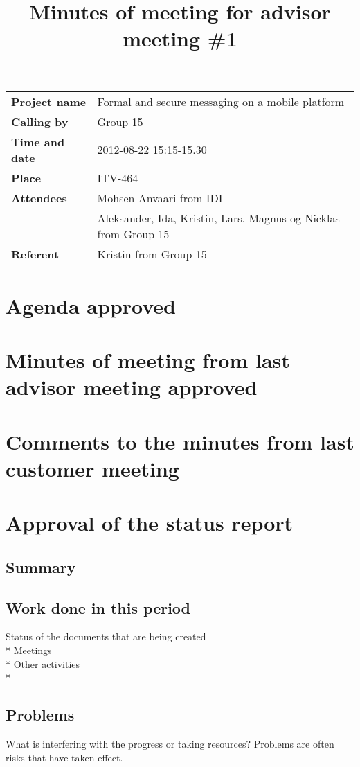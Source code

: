\documentclass[a4paper,12pt]{article}
\begin{document}
\title{Minutes of meeting for advisor meeting \#1}
\maketitle
\begin{tabular}{>{\bfseries}l l}	
Project name&Formal and secure messaging on a mobile platform\\
Calling by&Group 15\\
Time and date&2012-08-22 15:15-15.30\\
Place&ITV-464\\
Attendees&Mohsen Anvaari from IDI\\
 & Aleksander, Ida, Kristin, Lars, Magnus og Nicklas from Group 15\\
Referent&Kristin from Group 15\\
\end{tabular}
\section{Agenda approved}
\section{Minutes of meeting from last advisor meeting approved}
\section{Comments to the minutes from last customer meeting}
\section{Approval of the status report}
\subsection{Summary}
\subsection{Work done in this period}
Status of the documents that are being created\\*
Meetings\\*
Other activities\\*
\subsection{Problems}
What is interfering with the progress or taking resources? Problems are often risks that have taken effect.
\end{document}
